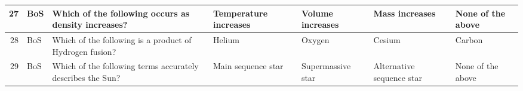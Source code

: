 \documentclass[10pt]{article}
\begin{document}
\begin{tiny}
\begin{longtable}{r|p{0.375in}|p{1.275in}|p{0.75in}|p{0.75in}|p{0.75in}|p{0.75in}}
    27    &     BoS &                                                                                                                                                                                                                              Which of the following occurs as density increases? &                                                                                                                 Temperature increases &                                                                                      Volume increases &                                                                                                             Mass increases &                                                                                                                 None of the above \\\hline
    28    &     BoS &                                                                                                                                                                                                                          Which of the following is a product of Hydrogen fusion? &                                                                                                                                Helium &                                                                                                Oxygen &                                                                                                                     Cesium &                                                                                                                            Carbon \\\hline
    29    &     BoS &                                                                                                                                                                                                                       Which of the following terms accurately describes the Sun? &                                                                                                                    Main sequence star &                                                                                     Supermassive star &                                                                                                  Alternative sequence star &                                                                                                                 None of the above \\\hline

\end{longtable}
\end{tiny}
\end{document}

